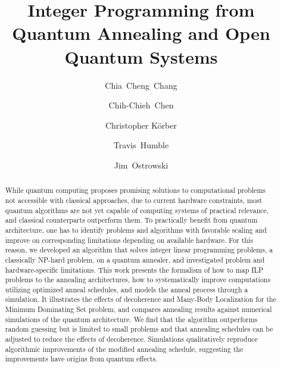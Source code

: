 \documentclass[prd,twocolumn,tightenlines,preprintnumbers,showpacs,superscriptaddress,notitlepage,nofootinbib,eqsecnum,floatfix,longbibliography,aps,10pt]{revtex4-2}
\begin{document}
\title{Integer Programming from Quantum Annealing and Open Quantum Systems}

\author{Chia~Cheng~Chang}
	\author{Chih-Chieh~Chen }
\author{Christopher K\"orber}
\author{Travis~Humble}
\author{Jim~Ostrowski}

\newcommand{\alert}[1]{\textbf{\color{red}{#1}}}
\renewcommand{\vec}[1]{\boldsymbol{#1}}

\newcommand{\ghissue}[2]{
 \noindent\fbox{\parbox{0.49\textwidth}{
   \alert{[#1]}%
   \\%
   \href{https://github.com/cchang5/quantum\_linear\_programming/pull/#2}{See GitHub issue #2}}%
 }
}


\begin{abstract}
 While quantum computing proposes promising solutions to computational problems not accessible with classical approaches, due to current hardware constraints, most quantum algorithms are not yet capable of computing systems of practical relevance, and classical counterparts outperform them.
 To practically benefit from quantum architecture, one has to identify problems and algorithms with favorable scaling and improve on corresponding limitations depending on available hardware.
 For this reason, we developed an algorithm that solves integer linear programming problems, a classically NP-hard problem, on a quantum annealer, and investigated problem and hardware-specific limitations.
 This work presents the formalism of how to map ILP problems to the annealing architectures, how to systematically improve computations utilizing optimized anneal schedules, and models the anneal process through a simulation.
 It illustrates the effects of decoherence and Many-Body Localization for the Minimum Dominating Set problem, and compares annealing results against numerical simulations of the quantum architecture.
 We find that the algorithm outperforms random guessing but is limited to small problems and that annealing schedules can be adjusted to reduce the effects of decoherence.
 Simulations qualitatively reproduce algorithmic improvements of the modified annealing schedule, suggesting the improvements have origins from quantum effects.
\end{abstract}
\end{document}
